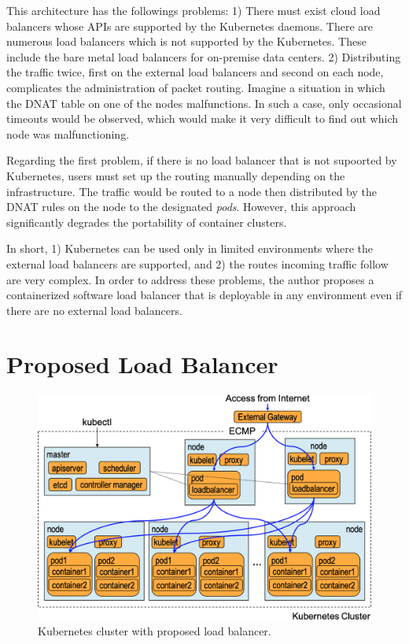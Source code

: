 This architecture has the followings problems: 
1) There must exist cloud load balancers whose APIs are supported by the Kubernetes daemons.
There are numerous load balancers which is not supported by the Kubernetes.
These include the bare metal load balancers for on-premise data centers.
2) Distributing the traffic twice, first on the external load balancers and second on each node, complicates the administration of packet routing. 
Imagine a situation in which the DNAT table on one of the nodes malfunctions.
In such a case, only occasional timeouts would be observed, which would make it very difficult to find out which node was malfunctioning.   

Regarding the first problem, if there is no load balancer that is not supoorted by Kubernetes, users must set up the routing manually depending on the infrastructure.
The traffic would be routed to a node then distributed by the DNAT rules on the node to the designated {\em pods}.
However, this approach significantly degrades the portability of container clusters.

In short, 1) Kubernetes can be used only in limited environments where the external load balancers are supported, and 2) the routes incoming traffic follow are very complex.
In order to address these problems, the author proposes a containerized software load balancer 
that is deployable in any environment even if there are no external load balancers.

\section{Proposed Load Balancer}\label{proposed_arch}

\begin{figure}
  \centering
  \includegraphics[width=0.8\columnwidth]{Figs/K8sProposed}
  \caption{Kubernetes cluster with proposed load balancer.}
  \label{fig:K8sProposed}
\end{figure}

